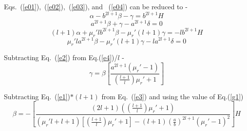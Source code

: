 
Eqs.~(\ref{e01}),~(\ref{e02}),~(\ref{e03}), and ~(\ref{e04}) can be reduced to -
\begin{equation}\label{e1}
\alpha- b^{2l+1}\beta-\gamma=b^{2l+1}H
\end{equation}
\begin{equation}\label{e2}
 a^{2l+1}\beta+\gamma-a^{2l+1}\delta =0
\end{equation}
\begin{equation}\label{e3}
(l+1)\alpha+\mu_r' l b^{2l+1}\beta-\mu_r'(l+1)\gamma=-lb^{2l+1}H
\end{equation}
\begin{equation}\label{e4}
\mu_r'l a^{2l+1}\beta -\mu_r'(l+1)\gamma- l a^{2l+1}\delta=0
\end{equation}

Subtracting Eq.~(\ref{e2}) from Eq.(\ref{e4})/$l$ -
\begin{equation}\label{g1}
\gamma=\beta \left[\frac{a^{2l+1}(\mu_r'-1)}{\left(\frac{l+1}{l}\right)\mu_r'+1}\right]
\end{equation}

Subtracting Eq.~(\ref{e1})$*(l+1)$ from Eq.~(\ref{e3}) and using the value of Eq.(\ref{g1})
\begin{equation}\label{bt1}
\beta=-\left[\frac{(2l+1)\left(\left(\frac{l+1}{l}\right)\mu_r'+1\right)}{(\mu_r'l+l+1)\left[\left(\frac{l+1}{l}\right)\mu_r'+1\right]-(l+1)\left(\frac{a}{b}\right)^{2l+1}(\mu_r'-1)^2}\right]H
\end{equation}

